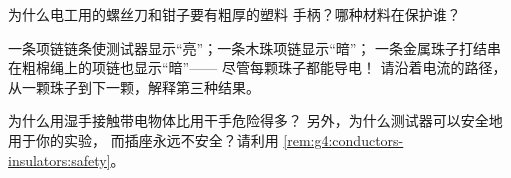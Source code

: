 \begin{exercise}[$\star$]\label{exo:g4:conductors-insulators:9}
为什么电工用的螺丝刀和钳子要有粗厚的塑料
手柄？哪种材料在保护谁？
\end{exercise}

\begin{exercise}[$\star\star$]\label{exo:g4:conductors-insulators:10}
一条项链链条使测试器显示“亮”；一条木珠项链显示“暗”；
一条金属珠子打结串在粗棉绳上的项链也显示“暗”——
尽管每颗珠子都能导电！
请沿着电流的路径，
从一颗珠子到下一颗，解释第三种结果。
\end{exercise}

\begin{exercise}[$\star\star$]\label{exo:g4:conductors-insulators:11}
为什么用湿手接触带电物体比用干手危险得多？
另外，为什么测试器可以安全地用于你的实验，
而插座永远不安全？请利用
\cref{rem:g4:conductors-insulators:safety}。
\end{exercise}
